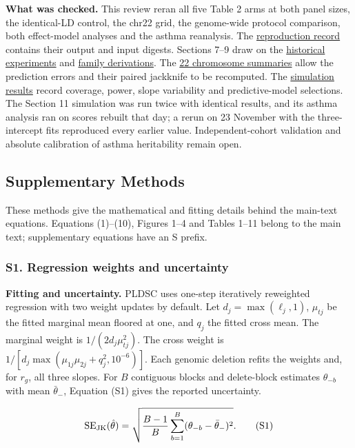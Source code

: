 \documentclass[11pt,a4paper]{article}
\let\reportsection\subsection
\newif\ifinsupplement
\renewcommand{\subsection}[1]{\clearpage
  \ifstrequal{#1}{Supplementary Methods}{\insupplementtrue
    \fancyhead[R]{\small\sffamily Supplementary methods}}{}
  \reportsection{#1}}
\begin{document}
\textbf{What was checked.} This review reran all five Table 2 arms at both panel sizes, the identical-LD control, the chr22 grid, the genome-wide protocol comparison, both effect-model analyses and the asthma reanalysis. The \href{reproduction.txt}{reproduction record} contains their output and input digests. Sections 7--9 draw on the \href{../experiments/RESULTS.md}{historical experiments} and \href{../docs/METHOD.md}{family derivations}. The \href{asthma_score_shape.json}{22 chromosome summaries} allow the prediction errors and their paired jackknife to be recomputed. The \href{score_shape_simulation.json}{simulation results} record coverage, power, slope variability and predictive-model selections. The Section 11 simulation was run twice with identical results, and its asthma analysis ran on scores rebuilt that day; a rerun on 23 November with the three-intercept fits reproduced every earlier value. Independent-cohort validation and absolute calibration of asthma heritability remain open.

\subsection{Supplementary Methods}\label{supplementary-methods}

These methods give the mathematical and fitting details behind the main-text equations. Equations (1)--(10), Figures 1--4 and Tables 1--11 belong to the main text; supplementary equations have an S prefix.

\subsubsection{S1. Regression weights and uncertainty}\label{s1-regression-weights-and-uncertainty}

\textbf{Fitting and uncertainty.} PLDSC uses one-step iteratively reweighted regression with two weight updates by default. Let \(d_j=\max(\ell_j,1)\), \(\mu_{tj}\) be the fitted marginal mean floored at one, and \(q_j\) the fitted cross mean. The marginal weight is \(1/(2d_j\mu_{tj}^2)\). The cross weight is \(1/[d_j\max(\mu_{1j}\mu_{2j}+q_j^2,10^{-6})]\). Each genomic deletion refits the weights and, for \(r_g\), all three slopes. For \(B\) contiguous blocks and delete-block estimates \(\theta_{-b}\) with mean \(\bar\theta_-\), Equation (S1) gives the reported uncertainty.

\[
\operatorname{SE}_{\rm JK}(\hat\theta)=
\sqrt{\frac{B-1}{B}\sum_{b=1}^{B}(\theta_{-b}-\bar\theta_-)^2}. \tag{S1}
\]
\end{document}
